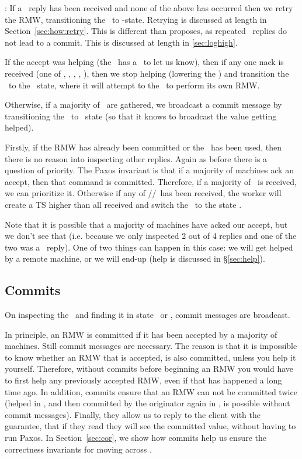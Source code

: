 \item \loghigh: If a \loghigh~reply has been received and none of the above has occurred then we retry the RMW, transitioning the \locentry~to \retry-state. Retrying is discussed at length in Section~\ref{sec:how:retry}. This is different than proposes, as repeated \loghigh~replies do not lead to a commit. This is discussed at length in \ref{sec:loghigh}.

\squishend

\custvspace{}
If the accept was helping (the \locentry~has a \helpflag~to let us know), then if 
any one nack is received (\ie one of \alreadycom, \loglow, \highprop, \highacc, \loghigh), then we stop helping (lowering the \helpflag) and transition the \locentry~to the \need~state, where it will attempt to  the \kv~to perform its own RMW.

Otherwise, if a majority of \acks~are gathered, we broadcast a commit message by transitioning the \locentry~to \bcasthelp~state (so that it knows to broadcast the value getting helped).


\custvspace{}
Firstly, if the RMW has already been committed or the \logno~has been used, then there is no reason into inspecting other replies.
Again as before there is a question of priority.
The Paxos invariant is that if a majority of machines ack an accept, then that command is committed.
Therefore, if a majority of \acks~is received, we can prioritize it.  
Otherwise if any of \highprop/\highacc/\loghigh~has been received, the worker will create a TS higher than all received and switch the \locentry~to the state \retry.

Note that it is possible that a majority of machines have acked our accept, but we don't see that (i.e. because we only inspected 2 out of 4 replies and one of the two was a \highprop~reply). One of two things can happen in this case: we will get helped by a remote machine, or we will end-up  (help is discussed in \S\ref{sec:help}). 


\subsection{Commits}
On inspecting the \locentry~and finding it in state \bcast~or \bcasthelp, commit messages are broadcast. 

\custvspace{}
In principle, an RMW is committed if it has been accepted by a majority of machines.
Still commit messages are necessary. The reason is that it is impossible to know whether an RMW that is accepted, is also committed, unless you help it yourself.
Therefore, without commits before beginning an RMW you would have to first help any previously accepted RMW, even if that has happened a long time ago.
In addition, commits ensure that an RMW can not be committed twice (\eg helped in , and then committed by the originator again in , is possible without commit messages). Finally, they allow us to reply to the client with the guarantee, that if they read they will see the committed value, without having to run Paxos. In Section~\ref{sec:cor}, we show how commits help us ensure the correctness invariants for moving across \lognos.



